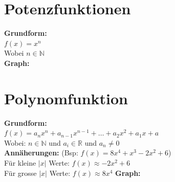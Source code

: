 \documentclass[11pt,twocolumn,a4paper]{article}
\title{\titleText}
\author{\authorText}
\date{\dateText}
\newcommand*{\field}[1]{\mathbb{#1}}%
\begin{document}
\section{Potenzfunktionen}
\textbf{Grundform:}\\
\(f(x) = x^n\)\\Wobei \(n \in \field{N}\)\\
\textbf{Graph:}\\
\section{Polynomfunktion}
\textbf{Grundform:}\\
\(f(x) = a_nx^n + a_{n-1}x^{n-1} + \dots + a_2x^2 + a_1x + a \)\\
Wobei: \(n \in \field{N}\) und \(a_i \in \field{R}\) und \(a_n \ne 0\)\\
\textbf{Annäherungen:} (Bsp: \(f(x)=8x^4+x^3-2x^2+6\))\\
Für kleine \(|x|\) Werte: \(f(x) \approx -2x^2 + 6\)\\
Für grosse \(|x|\) Werte: \(f(x) \approx 8x^4\)
\textbf{Graph:}\\
\end{document}

